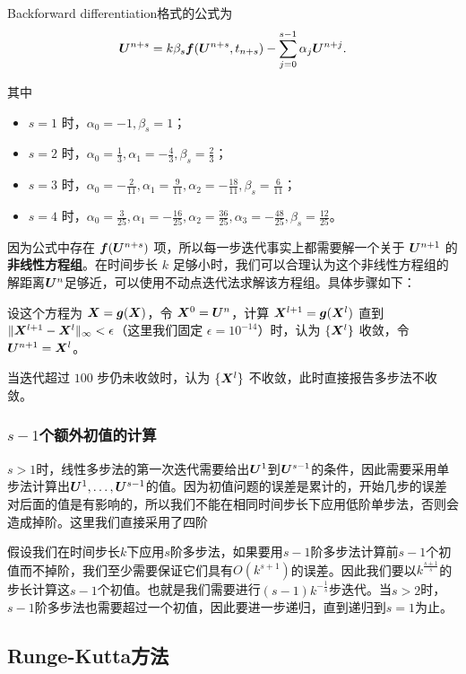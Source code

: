 \documentclass[lang=cn,a4paper,newtx,bibend=bibtex]{elegantpaper}
\begin{document}
Backforward differentiation格式的公式为
\begin{equation*}
    \bm{U}^{n+s} = k\beta_s\bm{f}(\bm{U}^{n+s}, t_{n+s}) - \sum_{j=0}^{s-1}\alpha_j\bm{U}^{n+j}.
\end{equation*}

其中
\begin{itemize}
    \item $s=1$ 时，$\alpha_0 = -1, \beta_s = 1$；
    \item $s=2$ 时，$\alpha_0 = \frac 13, \alpha_1 = -\frac 43, \beta_s = \frac 23$；
    \item $s=3$ 时，$\alpha_0 = -\frac{2}{11}, \alpha_1 = \frac{9}{11}, \alpha_2 = -\frac{18}{11}, \beta_s = \frac{6}{11}$；
    \item $s=4$ 时，$\alpha_0 = \frac{3}{25}, \alpha_1 = -\frac{16}{25}, \alpha_2 = \frac{36}{25}, \alpha_3 = -\frac{48}{25}, \beta_s = \frac{12}{25}$。
\end{itemize}

因为公式中存在 $\bm{f}(\bm{U}^{n+s})$ 项，所以每一步迭代事实上都需要解一个关于 $\bm{U}^{n+1}$ 的\textbf{非线性方程组}。在时间步长 $k$ 足够小时，我们可以合理认为这个非线性方程组的解距离$\bm{U}^n$足够近，可以使用不动点迭代法求解该方程组。具体步骤如下：

设这个方程为 $\bm{X} = \bm{g}(\bm{X})$，令 $\bm{X}^0 = \bm{U}^n$，计算 $\bm{X}^{l+1} = \bm{g}(\bm{X}^l)$ 直到 $\Vert \bm{X}^{l+1} - \bm{X}^l\Vert_\infty < \epsilon$（这里我们固定 $\epsilon = 10^{-14}$）时，认为 $\{\bm{X}^l\}$ 收敛，令 $\bm{U}^{n+1} = \bm{X}^l$。

当迭代超过 $100$ 步仍未收敛时，认为 $\{\bm{X}^l\}$ 不收敛，此时直接报告多步法不收敛。 

\subsubsection{$s-1$个额外初值的计算}

$s>1$时，线性多步法的第一次迭代需要给出$\bm{U}^1$到$\bm{U}^{s-1}$的条件，因此需要采用单步法计算出$\bm{U}^1,\dots,\bm{U}^{s-1}$的值。因为初值问题的误差是累计的，开始几步的误差对后面的值是有影响的，所以我们不能在相同时间步长下应用低阶单步法，否则会造成掉阶。这里我们直接采用了四阶

假设我们在时间步长$k$下应用$s$阶多步法，如果要用$s-1$阶多步法计算前$s-1$个初值而不掉阶，我们至少需要保证它们具有$O(k^{s+1})$的误差。因此我们要以$k^{\frac{s+1}s}$的步长计算这$s-1$个初值。也就是我们需要进行$(s-1)k^{-\frac 1s}$步迭代。当$s>2$时，$s-1$阶多步法也需要超过一个初值，因此要进一步递归，直到递归到$s=1$为止。

\subsection{Runge-Kutta方法}
\end{document}
